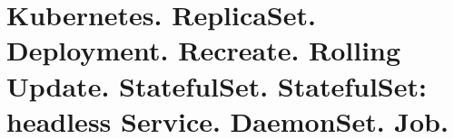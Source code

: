 \section{Kubernetes. ReplicaSet. Deployment. Recreate. Rolling Update. StatefulSet. StatefulSet:
headless Service. DaemonSet. Job.}

